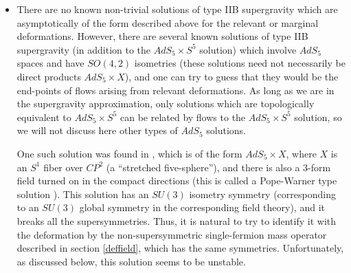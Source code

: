 \begin{itemize}
\item{} There are no known non-trivial solutions of type IIB
supergravity which are asymptotically of the form described above for
the relevant or marginal deformations. However, there are several
known solutions \cite{Romans:1985an,vanNieuwenhuizen:1985ri} of type
IIB supergravity (in addition to the $AdS_5\times S^5$ solution) which
involve $AdS_5$ spaces and have $SO(4,2)$ isometries (these solutions
need not necessarily be direct products $AdS_5\times X$), and one can
try to guess that they would be the end-points of flows arising from
relevant deformations. As long as we are in the supergravity
approximation, only solutions which are topologically equivalent to
$AdS_5\times S^5$ can be related by flows to the $AdS_5\times S^5$
solution, so we will not discuss here other types of $AdS_5$
solutions.

One such solution was found in \cite{Romans:1985an}, which is of the
 form $AdS_5\times X$, where $X$ is an $S^1$ fiber over $CP^2$ (a
 ``stretched five-sphere''), and there is also a 3-form field turned
 on in the compact directions (this is called a Pope-Warner type
 solution \cite{Pope:1985jj}). This solution has an $SU(3)$ isometry
 symmetry (corresponding to an $SU(3)$ global symmetry in the
 corresponding field theory), and it breaks all the
 supersymmetries. Thus, it is natural to try to identify it with the
 deformation by the non-supersymmetric single-fermion mass operator
 described in section \ref{deffield}, which has the same
 symmetries. Unfortunately, as discussed below, this solution seems to
 be unstable.


\end{itemize}
